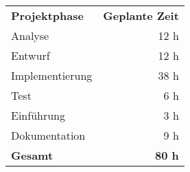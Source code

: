 \begin{tabular}{lr}
\rowcolor{heading}\textbf{Projektphase} & \textbf{Geplante Zeit} \\
Analyse & 12 h \\
\rowcolor{odd}Entwurf & 12 h \\
Implementierung & 38 h \\
\rowcolor{odd}Test & 6 h \\
Einführung & 3 h \\
\rowcolor{odd}Dokumentation & 9 h \\
\hline
\hline
\rowcolor{odd}\textbf{Gesamt} & \textbf{80 h} \\
\end{tabular}




